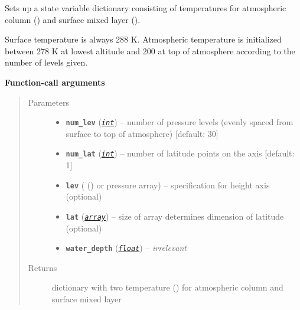 \documentclass[a4paper,10pt,english]{sphinxmanual}
\begin{document}
\begin{fulllineitems}
\label{api/climlab.domain:climlab.domain.initial.column_state}
Sets up a state variable dictionary consisting of temperatures
for atmospheric column () and surface mixed layer ().

Surface temperature is always 288 K. Atmospheric temperature is initialized 
between 278 K at lowest altitude and 200 at top of atmosphere according to
the number of levels given.

\textbf{Function-call arguments}
\begin{quote}\begin{description}
\item[{Parameters}] \leavevmode\begin{itemize}
\item {} 
\textbf{\texttt{num\_lev}} (\href{http://docs.python.org/2.7/library/functions.html\#int}{\emph{\texttt{int}}}) -- number of pressure levels
(evenly spaced from surface to top of atmosphere) 
{[}default: 30{]}

\item {} 
\textbf{\texttt{num\_lat}} (\href{http://docs.python.org/2.7/library/functions.html\#int}{\emph{\texttt{int}}}) -- number of latitude points on the axis
{[}default: 1{]}

\item {} 
\textbf{\texttt{lev}} ({\hyperref[api/climlab.domain:climlab.domain.axis.Axis]{\emph{}}} () 
or pressure array) -- specification for height axis (optional)

\item {} 
\textbf{\texttt{lat}} (\href{http://docs.python.org/2.7/library/array.html\#module-array}{\emph{\texttt{array}}}) -- size of array determines dimension of latitude
(optional)

\item {} 
\textbf{\texttt{water\_depth}} (\href{http://docs.python.org/2.7/library/functions.html\#float}{\emph{\texttt{float}}}) -- \emph{irrelevant}

\end{itemize}

\item[{Returns}] \leavevmode
dictionary with two temperature 
{\hyperref[api/climlab.domain:climlab.domain.field.Field]{\emph{}}} () 
for atmospheric column  and 
surface mixed layer 


\end{description}
\end{quote}
\end{fulllineitems}
\end{document}

